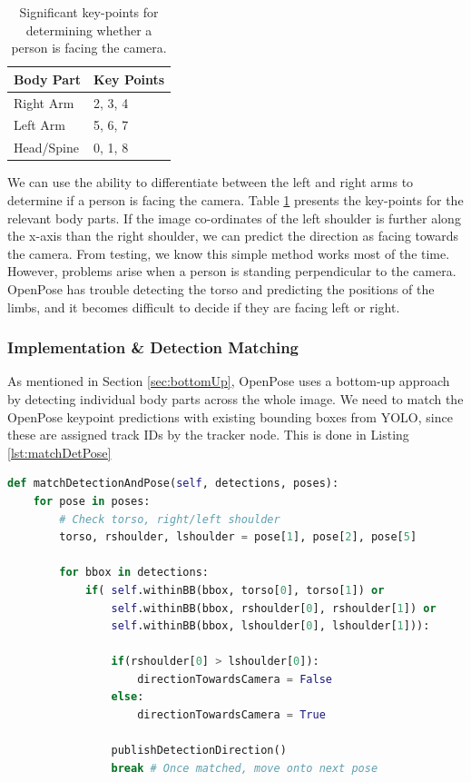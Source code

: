 \begin{table}[ht]
	\centering
	\begin{tabular}{|l|l|}
		\hline
		Body Part  & Key Points \\ \hline
		Right Arm  & 2, 3, 4    \\ \hline
		Left Arm   & 5, 6, 7    \\ \hline
		Head/Spine & 0, 1, 8    \\ \hline
	\end{tabular}
	\caption{Significant key-points for determining whether a person is facing the camera.}
	\label{tab:keypoints}
	\vspace{-1\baselineskip}
\end{table}

We can use the ability to differentiate between the left and right arms to determine if a person is facing the camera. Table \ref{tab:keypoints} presents the key-points for the relevant body parts. If the image co-ordinates of the left shoulder is further along the x-axis than the right shoulder, we can predict the direction as facing towards the camera. From testing, we know this simple method works most of the time. However, problems arise when a person is standing perpendicular to the camera. OpenPose has trouble detecting the torso and predicting the positions of the limbs, and it becomes difficult to decide if they are facing left or right.

\subsubsection{Implementation \& Detection Matching}
As mentioned in Section \ref{sec:bottomUp}, OpenPose uses a bottom-up approach by detecting individual body parts across the whole image. We need to match the OpenPose keypoint predictions with existing bounding boxes from YOLO, since these are assigned track IDs by the tracker node. This is done in Listing \ref{lst:matchDetPose} \\

\begin{lstlisting}[language=Python, caption={Direction and Detection Matching code in people\_direction.py}, label={lst:matchDetPose}]
def matchDetectionAndPose(self, detections, poses):
    for pose in poses:
        # Check torso, right/left shoulder
        torso, rshoulder, lshoulder = pose[1], pose[2], pose[5]

        for bbox in detections:
            if( self.withinBB(bbox, torso[0], torso[1]) or
                self.withinBB(bbox, rshoulder[0], rshoulder[1]) or
                self.withinBB(bbox, lshoulder[0], lshoulder[1])):
   
                if(rshoulder[0] > lshoulder[0]):
                    directionTowardsCamera = False
                else:
                    directionTowardsCamera = True

                publishDetectionDirection() 
                break # Once matched, move onto next pose 
\end{lstlisting}

